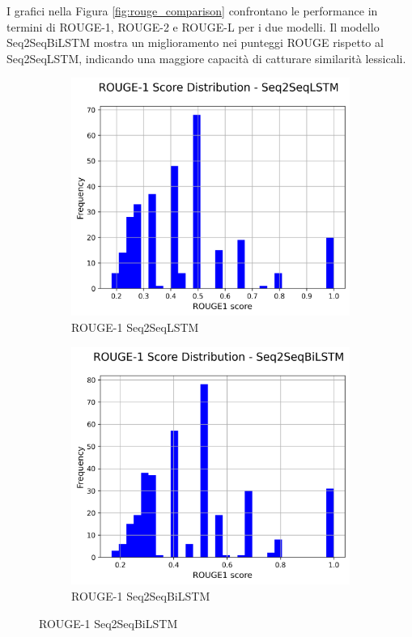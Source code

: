 \documentclass[a4paper, 12pt]{article}
\begin{document}
I grafici nella Figura \ref{fig:rouge_comparison} confrontano le performance in termini di ROUGE-1, ROUGE-2 e ROUGE-L per i due modelli. Il modello Seq2SeqBiLSTM mostra un miglioramento nei punteggi ROUGE rispetto al Seq2SeqLSTM, indicando una maggiore capacità di catturare similarità lessicali.
\begin{figure}[H]
    \centering
    \begin{subfigure}{0.32\textwidth}
        \centering
        \includegraphics[width=\textwidth]{media/Seq2SeqLSTM_rouge1_scores.png}
        \caption{ROUGE-1 Seq2SeqLSTM}
    \end{subfigure}
    \hfill
    \begin{subfigure}{0.32\textwidth}
        \centering
        \includegraphics[width=\textwidth]{media/Seq2SeqBiLSTM_rouge1_scores.png}
        \caption{ROUGE-1 Seq2SeqBiLSTM}
    \end{subfigure}
    

\end{figure}
\end{document}
